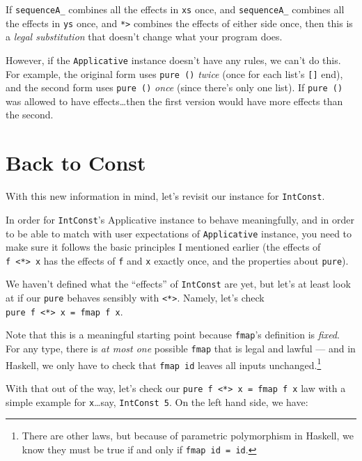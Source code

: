 \documentclass[]{article}
\begin{document}
If \texttt{sequenceA\_} combines all the effects in \texttt{xs} once, and
\texttt{sequenceA\_} combines all the effects in \texttt{ys} once, and
\texttt{*\textgreater{}} combines the effects of either side once, then this is
a \emph{legal substitution} that doesn't change what your program does.

However, if the \texttt{Applicative} instance doesn't have any rules, we can't
do this. For example, the original form uses \texttt{pure\ ()} \emph{twice}
(once for each list's \texttt{{[}{]}} end), and the second form uses
\texttt{pure\ ()} \emph{once} (since there's only one list). If
\texttt{pure\ ()} was allowed to have effects\ldots then the first version would
have more effects than the second.

\hypertarget{back-to-const}{%
\section{Back to Const}\label{back-to-const}}

With this new information in mind, let's revisit our instance for
\texttt{IntConst}.

In order for \texttt{IntConst}'s Applicative instance to behave meaningfully,
and in order to be able to match with user expectations of \texttt{Applicative}
instance, you need to make sure it follows the basic principles I mentioned
earlier (the effects of \texttt{f\ \textless{}*\textgreater{}\ x} has the
effects of \texttt{f} and \texttt{x} exactly once, and the properties about
\texttt{pure}).

We haven't defined what the ``effects'' of \texttt{IntConst} are yet, but let's
at least look at if our \texttt{pure} behaves sensibly with
\texttt{\textless{}*\textgreater{}}. Namely, let's check
\texttt{pure\ f\ \textless{}*\textgreater{}\ x\ =\ fmap\ f\ x}.

Note that this is a meaningful starting point because \texttt{fmap}'s definition
is \emph{fixed}. For any type, there is \emph{at most one} possible
\texttt{fmap} that is legal and lawful --- and in Haskell, we only have to check
that \texttt{fmap\ id} leaves all inputs unchanged.\footnote{There are other
  laws, but because of parametric polymorphism in Haskell, we know they must be
  true if and only if \texttt{fmap\ id\ =\ id}.}

With that out of the way, let's check our
\texttt{pure\ f\ \textless{}*\textgreater{}\ x\ =\ fmap\ f\ x} law with a simple
example for \texttt{x}\ldots say, \texttt{IntConst\ 5}. On the left hand side,
we have:
\end{document}
